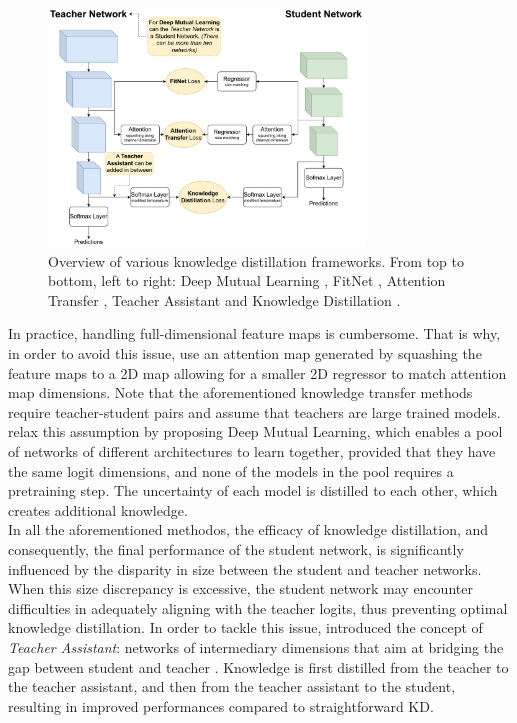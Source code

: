 \begin{figure}[htbp]
    \centering
    \includegraphics[width=0.75\textwidth]{chapter_sota/assets/kd_frameworks.pdf}
    \caption{Overview of various knowledge distillation frameworks. From top to
    bottom, left to right: Deep Mutual Learning
    \cite{DBLP:conf/cvpr/ZhangXHL18}, FitNet
    \cite{DBLP:journals/corr/RomeroBKCGB14}, Attention Transfer
    \cite{DBLP:conf/iclr/ZagoruykoK17}, Teacher Assistant
    \cite{DBLP:conf/aaai/MirzadehFLLMG20} and Knowledge Distillation
    \cite{DBLP:journals/corr/HintonVD15}.}
    \label{fig:sota:kd_frameworks}
\end{figure}

In practice, handling full-dimensional feature maps is cumbersome. That is why,
in order to avoid this issue, \cite{DBLP:conf/iclr/ZagoruykoK17} use an
attention map generated by squashing the feature maps to a 2D map allowing for a
smaller 2D regressor to match attention map dimensions. Note that the
aforementioned knowledge transfer methods require teacher-student pairs and
assume that teachers are large trained models. \cite{DBLP:conf/cvpr/ZhangXHL18}
relax this assumption by proposing Deep Mutual Learning, which enables a pool
of networks of different architectures to learn together, provided that they
have the same logit dimensions, and none of the models in the pool requires a
pretraining step. The uncertainty of each model is distilled to each other,
which creates additional knowledge.\\

In all the aforementioned methodos, the efficacy of knowledge distillation, and
consequently, the final performance of the student network, is significantly
influenced by the disparity in size between the student and teacher networks.
When this size discrepancy is excessive, the student network may encounter
difficulties in adequately aligning with the teacher logits, thus preventing
optimal knowledge distillation. In order to tackle this issue,
\citeauthor{DBLP:conf/aaai/MirzadehFLLMG20} introduced the concept of
\emph{Teacher Assistant}: networks of intermediary dimensions that aim at
bridging the gap between student and teacher
\cite{DBLP:conf/aaai/MirzadehFLLMG20}. Knowledge is first distilled from the
teacher to the teacher assistant, and then from the teacher assistant to the
student, resulting in improved performances compared to straightforward \ac{KD}.\\

